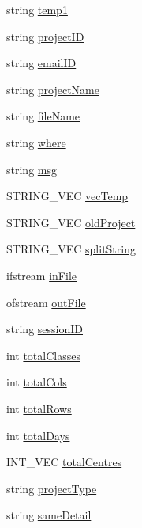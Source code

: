 \begin{DoxyCompactItemize}
\item 
string \hyperlink{classInputDetail_aa5659e496977cc83f743725f6aaf2d6a}{temp1}
\item 
string \hyperlink{classInputDetail_a08069ee622c626c038b821ddcc7427b4}{project\-I\-D}
\item 
string \hyperlink{classInputDetail_ad3f1db4fddbe0d4efbf1d5bc74d52257}{email\-I\-D}
\item 
string \hyperlink{classInputDetail_aaaf51475a2a4ddbe34e38c96bdb45bad}{project\-Name}
\item 
string \hyperlink{classInputDetail_a4a7fb27e52bed0f40de143634f2c486b}{file\-Name}
\item 
string \hyperlink{classInputDetail_a79d8a59940f25f4d2089e241c71a4279}{where}
\item 
string \hyperlink{classInputDetail_a1abb16cd695678c3fa05e3c812823fee}{msg}
\item 
S\-T\-R\-I\-N\-G\-\_\-\-V\-E\-C \hyperlink{classInputDetail_abee6a659eb2e34b260aaf8b05d6003b4}{vec\-Temp}
\item 
S\-T\-R\-I\-N\-G\-\_\-\-V\-E\-C \hyperlink{classInputDetail_ae8ccc2e838c6d5a93ea544370dc1f272}{old\-Project}
\item 
S\-T\-R\-I\-N\-G\-\_\-\-V\-E\-C \hyperlink{classInputDetail_ab09ed4176090a72237531cedf00afb41}{split\-String}
\item 
ifstream \hyperlink{classInputDetail_a4c62c1934fbfcdcc8e2afaee44a87c15}{in\-File}
\item 
ofstream \hyperlink{classInputDetail_a2b8484cfbfee98ae69e8476f8fd40000}{out\-File}
\item 
string \hyperlink{classInputDetail_a1f276e4df260009d465032ec64f3a543}{session\-I\-D}
\item 
int \hyperlink{classInputDetail_aac4c49f5453d86c4c79bcb87361ad28d}{total\-Classes}
\item 
int \hyperlink{classInputDetail_aeba19a14044746fd0c87b356d05d88c0}{total\-Cols}
\item 
int \hyperlink{classInputDetail_a3710702eafae009629e99f1dc76d5285}{total\-Rows}
\item 
int \hyperlink{classInputDetail_a8d1ba029791bb9b87330400d82cdbcde}{total\-Days}
\item 
I\-N\-T\-\_\-\-V\-E\-C \hyperlink{classInputDetail_a11f9eb0c33682bf3c9b1e2cac50ebaad}{total\-Centres}
\item 
string \hyperlink{classInputDetail_ad2c46fdc8093eb88e01497e55b2e8e4d}{project\-Type}
\item 
string \hyperlink{classInputDetail_a13313d76b2ccc308634a7d802a46936a}{same\-Detail}

\end{DoxyCompactItemize}
